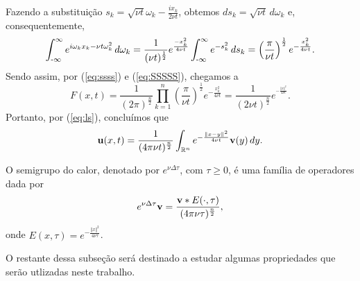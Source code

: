 Fazendo a substituição $s_k = \sqrt{\nu t}\omega_k - \frac{ix_k}{2\nu t}$, obtemos $ds_k = \sqrt{\nu t} \,d\omega_k$ e, consequentemente,
\begin{equation} \label{eq:SSSSS}
    \int_{\text{-}\infty}^{\infty} e^{i \omega_k x_k - \nu t\omega_k^2} \,d\omega_k = \frac{1}{(\nu t)^{\frac{1}{2}}} e^{\frac{-x_k^2}{4\nu t}} \int_{\text{-}\infty}^\infty e^{-s_k^2} \,ds_k = \left( \frac{\pi}{\nu t} \right)^{\frac{1}{2}} e^{-\frac{x_k^2}{4\nu t}}.
\end{equation}
Sendo assim, por (\ref{eq:ssss}) e (\ref{eq:SSSSS}), chegamos a
\[
    F(x,t)  =  \frac{1}{(2\pi)^\frac{n}{2}}\prod_{k=1}^n \left( \frac{\pi}{\nu t} \right)^{\frac{1}{2}} e^{-\frac{x_k^2}{4\nu t}} = \frac{1}{(2\nu t)^\frac{n}{2}} e^{^{-\frac{\Vert x \Vert^2}{4\nu t}}}.
\]
Portanto, por (\ref{eq:ls}), concluímos que
\[
    \mathbf{u} (x,t) = \frac{1}{(4\pi\nu t)^{\frac{n}{2}}} \int_{\mathbb{R}^n} e^{-\frac{\Vert x - y \Vert^2}{4 \nu t}} \mathbf{v}(y) \,dy.
\]

O semigrupo do calor, denotado por $e^{\nu \Delta \tau}$, com $\tau \geqslant 0$, é uma família de operadores dada por
\[
    e^{\nu \Delta \tau} \mathbf{v} = \frac{\mathbf{v} * E(\cdot,\tau)}{(4\pi \nu \tau)^{\frac{n}{2}}},
\]
onde $E(x,\tau) = e^{-\frac{\Vert x \Vert^2}{4 \nu \tau}}$.

O restante dessa subseção será destinado a estudar algumas propriedades que serão utlizadas neste trabalho.

